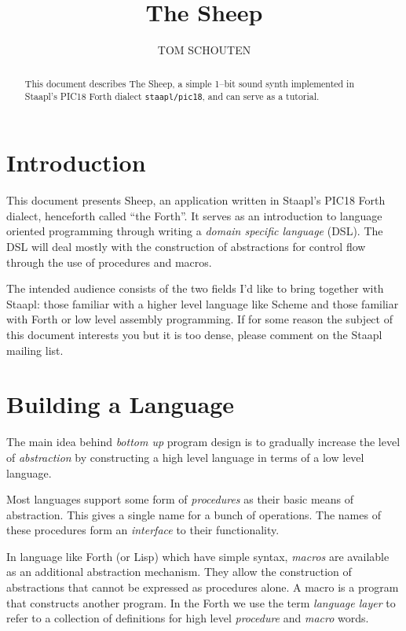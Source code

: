 \documentclass[12pt]{article}
\begin{document}
\title{{\LARGE \textbf{The Sheep}}}
\author{\large TOM SCHOUTEN}
 \maketitle

\begin{abstract}
  This document describes The Sheep, a simple 1--bit sound synth
  implemented in Staapl's PIC18 Forth dialect \verb|staapl/pic18|, and
  can serve as a tutorial.
\end{abstract}


\section{Introduction}

This document presents Sheep, an application written in Staapl's PIC18
Forth dialect, henceforth called ``the Forth''. It serves as an
introduction to language oriented programming through writing a
\emph{domain specific language} (DSL).  The DSL will deal mostly with
the construction of abstractions for control flow through the use of
procedures and macros.

The intended audience consists of the two fields I'd like to bring
together with Staapl: those familiar with a higher level language like
Scheme and those familiar with Forth or low level assembly
programming.  If for some reason the subject of this document
interests you but it is too dense, please comment on the Staapl
mailing list.

\section{Building a Language}


The main idea behind \emph{bottom up} program design is to gradually
increase the level of \emph{abstraction} by constructing a high level
language in terms of a low level language.

Most languages support some form of \emph{procedures} as their basic
means of abstraction. This gives a single name for a bunch of
operations. The names of these procedures form an \emph{interface} to
their functionality.

In language like Forth (or Lisp) which have simple syntax,
\emph{macros} are available as an additional abstraction mechanism.
They allow the construction of abstractions that cannot be expressed
as procedures alone.  A macro is a program that constructs another
program.  In the Forth we use the term \emph{language layer} to refer
to a collection of definitions for high level \emph{procedure} and
\emph{macro} words.
\end{document}
